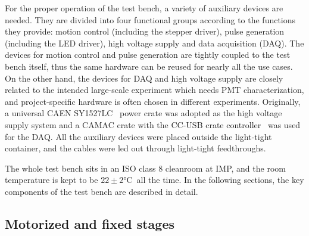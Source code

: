 \documentclass{nst}
\providecommand{\DIFadd}[1]{{\protect\color{yellow} \sf #1}} %
\providecommand{\DIFaddbegin}{} %
\providecommand{\DIFaddend}{} %
\providecommand{\DIFdelbegin}{} %
\providecommand{\DIFdelend}{} %
\begin{document}
For the proper operation of the test bench, a variety of auxiliary \DIFdelbegin \DIFdelend \DIFaddbegin \DIFadd{devices }\DIFaddend are needed. 
They are divided into four \DIFaddbegin \DIFadd{functional }\DIFaddend groups according to the functions they provide: motion control (including the stepper driver), pulse generation (including the LED driver), high voltage supply and data acquisition (DAQ).
The \DIFdelbegin \DIFdelend \DIFaddbegin \DIFadd{devices for }\DIFaddend motion control and \DIFdelbegin \DIFdelend pulse generation are tightly coupled to the test bench itself, thus the same hardware can be reused for nearly all the \DIFdelbegin \DIFdelend \DIFaddbegin \DIFadd{use cases}\DIFaddend .
On the other hand, the \DIFdelbegin \DIFdelend \DIFaddbegin \DIFadd{devices for DAQ and }\DIFaddend high voltage supply \DIFdelbegin \DIFdelend \DIFaddbegin \DIFadd{are closely related to the intended large-scale experiment which needs }\DIFaddend PMT characterization, and \DIFdelbegin \DIFdelend project-specific hardware is \DIFdelbegin \DIFdelend \DIFaddbegin \DIFadd{often chosen }\DIFaddend in different experiments.
Originally, a universal CAEN SY1527LC~\cite{sy1527lc} power crate \DIFdelbegin \DIFdelend \DIFaddbegin \DIFadd{was }\DIFaddend adopted as the high voltage supply system and a CAMAC crate with the CC-USB crate controller~\cite{cc_usb} \DIFdelbegin \DIFdelend \DIFaddbegin \DIFadd{was used for }\DIFaddend the DAQ.
All the auxiliary \DIFdelbegin \DIFdelend \DIFaddbegin \DIFadd{devices were }\DIFaddend placed outside the light-tight container, and the cables \DIFdelbegin \DIFdelend \DIFaddbegin \DIFadd{were }\DIFaddend led out through light-tight feedthroughs.

The whole test bench sits in an ISO class 8 cleanroom at IMP, and the room temperature is kept to be $22\pm2$\si{\celsius}~all the time. 
In the following sections, the key components of the test bench are described in detail.

\subsection{Motorized and fixed stages}
\label{sec:stages}
\end{document}
